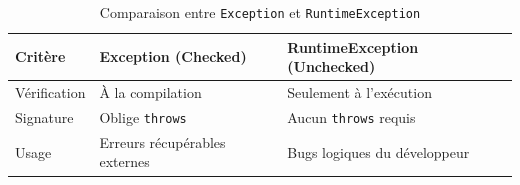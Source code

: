 \begin{table}[H]
\centering
\begin{tabularx}{0.9\textwidth}{C{3.5cm} X X}
\toprule
\textbf{\color{primarycolor}Critère} &
\textbf{\color{primarycolor}Exception (Checked)} &
\textbf{\color{primarycolor}RuntimeException (Unchecked)} \\
\midrule
Vérification & À la compilation & Seulement à l'exécution \\
\addlinespace[0.15cm]
Signature & Oblige \texttt{throws} & Aucun \texttt{throws} requis \\
\addlinespace[0.15cm]
Usage & Erreurs récupérables externes & Bugs logiques du développeur \\
\bottomrule
\end{tabularx}
\caption{Comparaison entre \texttt{Exception} et \texttt{RuntimeException}}
\end{table}
